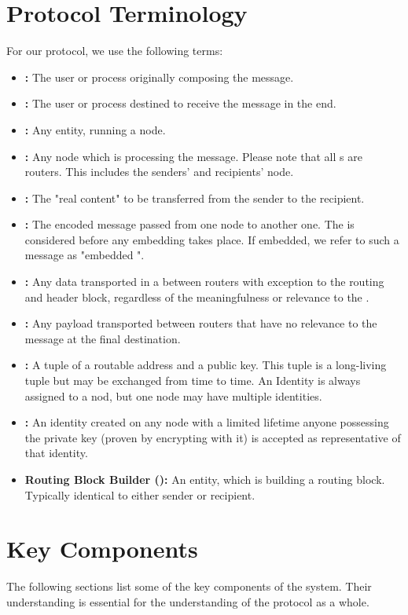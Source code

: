 \section{Protocol Terminology}
For our protocol, we use the following terms:
\begin{itemize}
	\item \textbf{:} The user or process originally composing the message.
	\item \textbf{:} The user or process destined to receive the message in the end.
	\item \textbf{:} Any entity, running a \MessageVortex{} node.
	\item \textbf{:} Any node which is processing the message. Please note that all \VortexNode{}s are routers. This includes the senders' and recipients' node.
	\item \textbf{:} The "real content" to be transferred from the sender to the recipient.    
	\item \textbf{:} The encoded message passed from one node to another one. The \VortexMessage{} is considered before any embedding takes place. If embedded, we refer to such a message as "embedded \VortexMessage".
	\item \textbf{:} Any data transported in a \VortexMessage{} between routers with exception to the routing and header block, regardless of the meaningfulness or relevance to the \VortexMessage.
	\item \textbf{:} Any payload transported between routers that have no relevance to the message at the final destination.
	\item \textbf{:} A tuple of a routable address and a public key. This tuple is a long-living tuple but may be exchanged from time to time. An Identity is always assigned to a nod, but one node may have multiple identities. 
	\item \textbf{:} An identity created on any node with a limited lifetime anyone possessing the private key (proven by encrypting with it) is accepted as representative of that identity.
	\item \textbf{Routing Block Builder ():} An entity, which is building a routing block. Typically identical to either sender or recipient.
\end{itemize}

\section{Key Components}
The following sections list some of the key components of the system. Their understanding is essential for the understanding of the protocol as a whole. 

